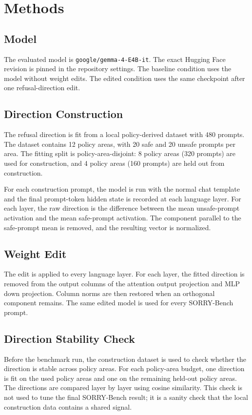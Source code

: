 \section{Methods}

\subsection{Model}

The evaluated model is \texttt{google/gemma-4-E4B-it}. The exact Hugging Face
revision is pinned in the repository settings. The baseline condition uses the
model without weight edits. The edited condition uses the same checkpoint after
one refusal-direction edit.

\subsection{Direction Construction}

The refusal direction is fit from a local policy-derived dataset with 480
prompts. The dataset contains 12 policy areas, with 20 safe and 20 unsafe
prompts per area. The fitting split is policy-area-disjoint: 8 policy areas
(320 prompts) are used for construction, and 4 policy areas (160 prompts) are
held out from construction.

For each construction prompt, the model is run with the normal chat template and
the final prompt-token hidden state is recorded at each language layer. For each
layer, the raw direction is the difference between the mean unsafe-prompt
activation and the mean safe-prompt activation. The component parallel to the
safe-prompt mean is removed, and the resulting vector is normalized.

\subsection{Weight Edit}

The edit is applied to every language layer. For each layer, the fitted
direction is removed from the output columns of the attention output projection
and MLP down projection. Column norms are then restored when an orthogonal
component remains. The same edited model is used for every SORRY-Bench prompt.

\subsection{Direction Stability Check}

Before the benchmark run, the construction dataset is used to check whether the
direction is stable across policy areas. For each policy-area budget, one
direction is fit on the used policy areas and one on the remaining held-out
policy areas. The directions are compared layer by layer using cosine
similarity. This check is not used to tune the final SORRY-Bench result; it is a
sanity check that the local construction data contains a shared signal.

